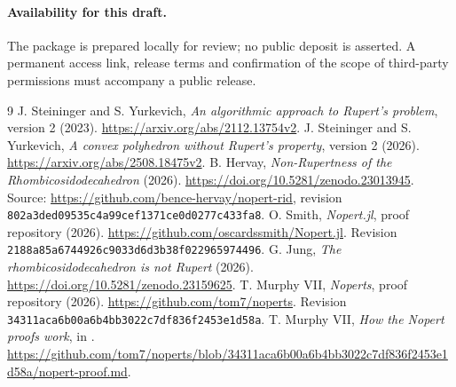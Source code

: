 \documentclass[11pt,a4paper]{article}
\begin{document}
\paragraph{Availability for this draft.}
The package is prepared locally for review; no public deposit is asserted.
A permanent access link, release terms and confirmation of the scope of
third-party permissions must accompany a public release.

\begin{thebibliography}{9}
 J. Steininger and S. Yurkevich,
\emph{An algorithmic approach to Rupert's problem}, version 2 (2023).
\url{https://arxiv.org/abs/2112.13754v2}.
 J. Steininger and S. Yurkevich,
\emph{A convex polyhedron without Rupert's property}, version 2 (2026).
\url{https://arxiv.org/abs/2508.18475v2}.
 B. Hervay,
\emph{Non-Rupertness of the Rhombicosidodecahedron} (2026).
\url{https://doi.org/10.5281/zenodo.23013945}.
Source: \url{https://github.com/bence-hervay/nopert-rid}, revision
\nolinkurl{802a3ded09535c4a99cef1371ce0d0277c433fa8}.
 O. Smith, \emph{Nopert.jl}, proof repository (2026).
\url{https://github.com/oscardssmith/Nopert.jl}.
Revision \nolinkurl{2188a85a6744926c9033d6d3b38f022965974496}.
 G. Jung,
\emph{The rhombicosidodecahedron is not Rupert} (2026).
\url{https://doi.org/10.5281/zenodo.23159625}.
 T. Murphy VII, \emph{Noperts}, proof repository (2026).
\url{https://github.com/tom7/noperts}.
Revision \nolinkurl{34311aca6b00a6b4bb3022c7df836f2453e1d58a}.
 T. Murphy VII,
\emph{How the Nopert proofs work}, in \cite{Murphy}.
\url{https://github.com/tom7/noperts/blob/34311aca6b00a6b4bb3022c7df836f2453e1d58a/nopert-proof.md}.
\end{thebibliography}
\end{document}
